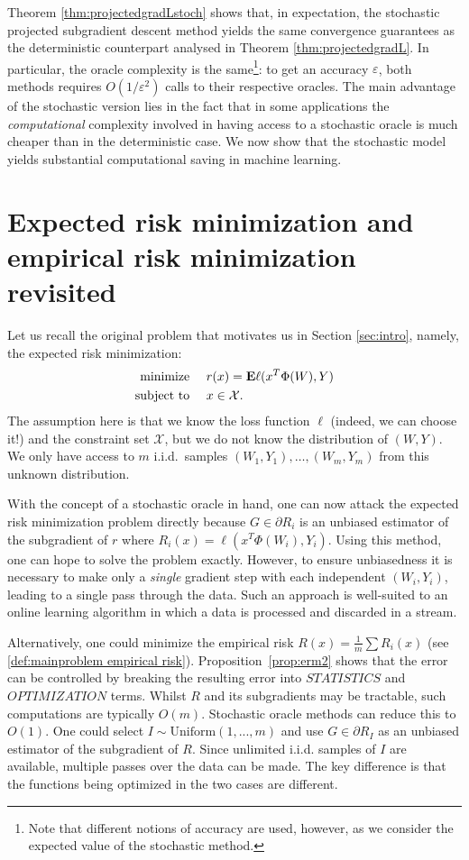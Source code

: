 Theorem \ref{thm:projectedgradLstoch} shows that, in expectation, the stochastic projected subgradient descent method yields the same convergence guarantees as the deterministic counterpart analysed in Theorem \ref{thm:projectedgradL}.  In particular, the oracle complexity is the same\footnote{Note that different notions of accuracy are used, however, as we consider the expected value of the stochastic method.}: to get an accuracy $\varepsilon$, both methods requires $O(1/\varepsilon^2)$ calls to their respective oracles. The main advantage of the stochastic version lies in the fact that in some applications the \emph{computational} complexity involved in having access to a stochastic oracle is much cheaper than in the deterministic case. We now show that the stochastic model yields substantial computational saving in machine learning.

\section{Expected risk minimization and empirical risk minimization revisited}
Let us recall the original problem that motivates us in Section \ref{sec:intro}, namely, the expected risk minimization:
\begin{align*}
	\begin{aligned}
		\text{minimize }\quad   & r(x) = \mathbf{E}\ell(x^T\Phi(W),Y) \\
		\text{subject to }\quad & x\in \mathcal{X}.
	\end{aligned}
\end{align*}
The assumption here is that we know the loss function $\ell$ (indeed, we can choose it!) and the constraint set $\mathcal{X}$, but we do not know the distribution of $(W,Y)$. We only have access to $m$ i.i.d.\ samples $(W_1,Y_1),\ldots,(W_m,Y_m)$ from this unknown distribution.

With the concept of a stochastic oracle in hand, one can now attack the expected risk minimization problem directly because $G \in \partial R_i$ is an unbiased estimator of the subgradient of $r$ where $R_i(x) = \ell(x^T\Phi(W_i), Y_i)$. Using this method, one can hope to solve the problem exactly. However, to ensure unbiasedness it is necessary to make only a \textit{single} gradient step with each independent $(W_i, Y_i)$, leading to a single pass through the data. Such an approach is well-suited to an online learning algorithm in which a data is processed and discarded in a stream.

Alternatively, one could minimize the empirical risk $R(x) = \frac{1}{m}\sum R_i(x)$ (see \eqref{def:mainproblem empirical risk}). Proposition~\ref{prop:erm2} shows that the error can be controlled by breaking the resulting error into $STATISTICS$ and $OPTIMIZATION$ terms. Whilst $R$ and its subgradients may be tractable, such computations are typically $O(m)$. Stochastic oracle methods can reduce this to $O(1)$. One could select $I \sim \text{Uniform}(1, ..., m)$ and use $G \in \partial R_I$ as an unbiased estimator of the subgradient of $R$. Since unlimited i.i.d. samples of $I$ are available, multiple passes over the data can be made. The key difference is that the functions being optimized in the two cases are different.

